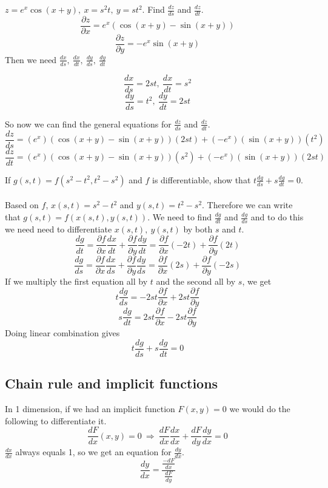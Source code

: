 \documentclass[12 pt]{article}
\begin{document}
        \begin{exmp*}
            $z=e^x\cos(x+y),\ x=s^2t,\ y=st^2$. Find $\frac{dz}{ds}$ and $\frac{dz}{dt}$.
            $$\frac{\partial z}{\partial x}=e^x(\cos(x+y)-\sin(x+y))$$
            $$\frac{\partial z}{\partial y}=-e^x\sin(x+y)$$
            Then we need $\frac{dx}{ds},\ \frac{dx}{dt},\ \frac{dy}{ds},\ \frac{dy}{dt}$
            \begin{center}
                $$\frac{dx}{ds}=2st,\ \frac{dx}{dt}=s^2$$
                $$\frac{dy}{ds}=t^2,\ \frac{dy}{dt}=2st$$
            \end{center}
            So now we can find the general equations for $\frac{dz}{ds}$ and $\frac{dz}{dt}$.
            $$\frac{dz}{ds}=(e^x)(\cos(x+y)-\sin(x+y))(2st)+(-e^x)(\sin(x+y))(t^2)$$
            $$\frac{dz}{dt}=(e^x)(\cos(x+y)-\sin(x+y))(s^2)+(-e^x)(\sin(x+y))(2st)$$
        \end{exmp*}

        \begin{exmp*}
            If $g(s,t)=f(s^2-t^2,t^2-s^2)$ and $f$ is differentiable, show that $t\frac{dg}{ds}+s\frac{dg}{dt}=0$.\\\\
            Based on $f$, $x(s,t)=s^2-t^2$ and $y(s,t)=t^2-s^2$. Therefore we can write that $g(s,t)=f(x(s,t),y(s,t))$. We need to find $\frac{dg}{dt}$ and $\frac{dg}{ds}$ and to do this we need need to differentiate $x(s,t),\ y(s,t)$ by both $s$ and $t$.
            $$\frac{dg}{dt}=\frac{\partial f}{\partial x}\frac{dx}{dt}+\frac{\partial f}{\partial y}\frac{dy}{dt}=\frac{\partial f}{\partial x}(-2t)+\frac{\partial f}{\partial y}(2t)$$
            $$\frac{dg}{ds}=\frac{\partial f}{\partial x}\frac{dx}{ds}+\frac{\partial f}{\partial y}\frac{dy}{ds}=\frac{\partial f}{\partial x}(2s)+\frac{\partial f}{\partial y}(-2s)$$
            If we multiply the first equation all by $t$ and the second all by $s$, we get
            $$t\frac{dg}{ds}=-2st\frac{\partial f}{\partial x}+2st\frac{\partial f}{\partial y}$$
            $$s\frac{dg}{dt}=2st\frac{\partial f}{\partial x}-2st\frac{\partial f}{\partial y}$$
            Doing linear combination gives
            $$t\frac{dg}{ds}+s\frac{dg}{dt}=0$$
        \end{exmp*}

        \subsection{Chain rule and implicit functions}

        In 1 dimension, if we had an implicit function $F(x,y)=0$ we would do the following to differentiate it.
        $$\frac{dF}{dx}(x,y)=0\ \Rightarrow\ \frac{dF}{dx}\frac{dx}{dx}+\frac{dF}{dy}\frac{dy}{dx}=0$$
        $\frac{dx}{dx}$ always equals 1, so we get an equation for $\frac{dy}{dx}$.
        $$\frac{dy}{dx}=\frac{\frac{-dF}{dx}}{\frac{dF}{dy}}$$
\end{document}
